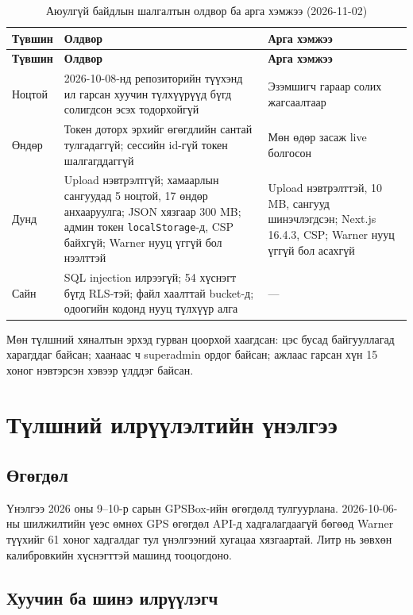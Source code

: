 \documentclass[
12pt,
oneside,
english,
onehalfspacing,
nolistspacing,
headsepline,
]{MUST-Thesis}
\begin{document}
{\small
\renewcommand{\arraystretch}{1.2}
\begin{longtable}{|L{1.8cm}|L{6.6cm}|L{5.4cm}|}
\caption{Аюулгүй байдлын шалгалтын олдвор ба арга хэмжээ (2026-11-02)}\label{tab:ch5-security}\\
\hline
{}\textbf{Түвшин} & \textbf{Олдвор} & \textbf{Арга хэмжээ} \\ \hline
\endfirsthead
\hline
{}\textbf{Түвшин} & \textbf{Олдвор} & \textbf{Арга хэмжээ} \\ \hline
\endhead
Ноцтой & 2026-10-08-нд репозиторийн түүхэнд ил гарсан хуучин түлхүүрүүд бүгд солигдсон эсэх тодорхойгүй & Эзэмшигч гараар солих жагсаалтаар \\ \hline
Өндөр & Токен доторх эрхийг өгөгдлийн сантай тулгадаггүй; сессийн id-гүй токен шалгагддаггүй & Мөн өдөр засаж live болгосон \\ \hline
Дунд & Upload нэвтрэлтгүй; хамаарлын сангуудад 5 ноцтой, 17 өндөр анхааруулга; JSON хязгаар 300 MB; админ токен \texttt{localStorage}-д, CSP байхгүй; Warner нууц үггүй бол нээлттэй & Upload нэвтрэлттэй, 10 MB, сангууд шинэчлэгдсэн; Next.js 16.4.3, CSP; Warner нууц үггүй бол асахгүй \\ \hline
Сайн & SQL injection илрээгүй; 54 хүснэгт бүгд RLS-тэй; файл хаалттай bucket-д; одоогийн кодонд нууц түлхүүр алга & --- \\ \hline
\end{longtable}
}

Мөн түлшний хяналтын эрхэд гурван цоорхой хаагдсан: цэс бусад байгууллагад харагддаг байсан; хаанаас ч superadmin ордог байсан; ажлаас гарсан хүн 15 хоног нэвтэрсэн хэвээр үлддэг байсан.

\section{Түлшний илрүүлэлтийн үнэлгээ}

\subsection{Өгөгдөл}

Үнэлгээ 2026 оны 9--10-р сарын GPSBox-ийн өгөгдөлд тулгуурлана. 2026-10-06-ны шилжилтийн үеэс өмнөх GPS өгөгдөл API-д хадгалагдаагүй бөгөөд Warner түүхийг 61 хоног хадгалдаг тул үнэлгээний хугацаа хязгаартай. Литр нь зөвхөн калибровкийн хүснэгттэй машинд тооцогдоно.

\subsection{Хуучин ба шинэ илрүүлэгч}
\end{document}
